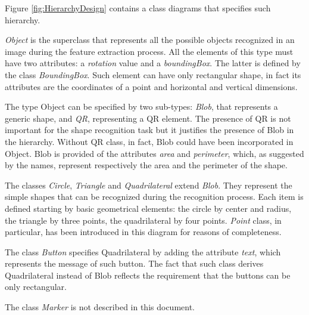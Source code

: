 	Figure \ref{fig:HierarchyDesign} contains a class diagrams that specifies such hierarchy. 

	\emph{Object} is the superclass that represents all the possible objects recognized in an image during the feature extraction process. 
	All the elements of this type must have two attributes: a \emph{rotation} value and a \emph{boundingBox}. 
	The latter is defined by the class \emph{BoundingBox}. Such element can have only rectangular shape, in fact its attributes are the coordinates of a point and horizontal and vertical dimensions.


	The type Object can be specified by two sub-types: \emph{Blob}, that represents a generic shape, and \emph{QR}, representing a \mbox{QR} element. The presence of \mbox{QR} is not important for the shape recognition task but it justifies the presence of Blob in the hierarchy. Without \mbox{QR} class, in fact, Blob could have been incorporated in Object.
	Blob is provided of the attributes \emph{area} and \emph{perimeter}, which, as suggested by the names, represent respectively the area and the perimeter of the shape.
	

	The classes \emph{Circle}, \emph{Triangle} and \emph{Quadrilateral} extend \emph{Blob}. They represent the simple shapes that can be recognized during the recognition process. Each item is defined starting by basic geometrical elements: the circle by center and radius, the triangle by three points, the quadrilateral by four points. \emph{Point} class, in particular, has been introduced in this diagram for reasons of completeness. 

	The class \emph{Button} specifies Quadrilateral by adding the attribute \emph{text}, which represents the message of such button. The fact that such class derives Quadrilateral instead of Blob reflects the requirement that the buttons can be only rectangular. 
	
	The class \emph{Marker} is not described in this document. 


